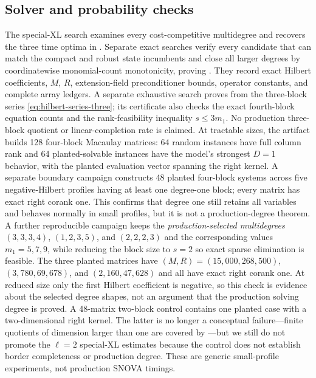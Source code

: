 \documentclass[11pt]{article}
\begin{document}
\subsection{Solver and probability checks}

The special-XL search examines every cost-competitive multidegree and
recovers the three time optima in .  Separate exact searches
verify every candidate that can match the compact and robust state incumbents
and close all larger degrees by coordinatewise monomial-count monotonicity,
proving .
They record exact Hilbert coefficients, $M$, $R$, extension-field
preconditioner bounds, operator constants, and complete array ledgers.  A
separate exhaustive search proves  from the
three-block series \eqref{eq:hilbert-series-three}; its certificate also checks
the exact fourth-block equation counts and the rank-feasibility inequality
$s\le3m_1$.  No production three-block quotient or linear-completion rate is
claimed.  At tractable sizes,
the artifact builds 128 four-block Macaulay matrices: 64 random instances have
full column rank and 64 planted-solvable instances have the model's strongest
$D=1$ behavior, with the planted evaluation vector spanning the right kernel.
A separate boundary campaign constructs 48 planted four-block systems across
five negative-Hilbert profiles having at least one degree-one block; every
matrix has exact right corank one.  This confirms that degree one still retains
all variables and behaves normally in small profiles, but it is not a
production-degree theorem.
  A further reproducible campaign keeps the
\emph{production-selected multidegrees} $(3,3,3,4)$, $(1,2,3,5)$, and
$(2,2,2,3)$ and the corresponding values $m_1=5,7,9$, while reducing the
block size to $s=2$ so exact sparse elimination is feasible.  The three
planted matrices have $(M,R)=(15{,}000,268{,}500)$,
$(3{,}780,69{,}678)$, and $(2{,}160,47{,}628)$ and all have exact right
corank one.  At reduced size only the first Hilbert coefficient is negative,
so this check is evidence about the selected degree shapes, not an argument
that the production solving degree is proved.  A 48-matrix two-block control contains one planted
case with a two-dimensional right kernel.  The latter is no longer a conceptual failure---finite quotients of
dimension larger than one are covered by
---but we still do not promote the
$\ell=2$ special-XL estimates because the control does not establish border
completeness or production degree.  These are generic small-profile
experiments, not production SNOVA timings.
\end{document}
